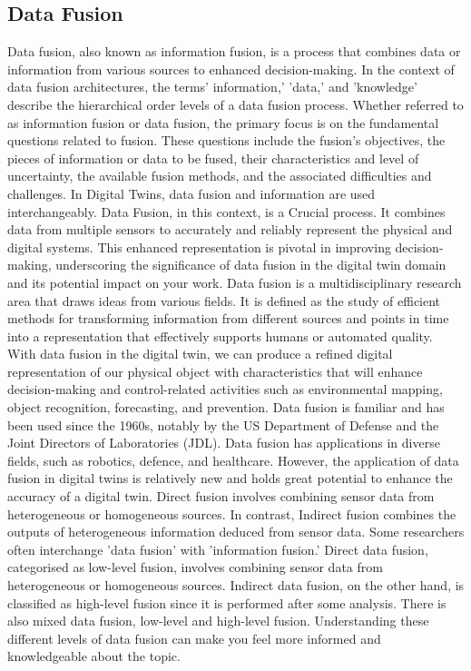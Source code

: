 \subsection{Data Fusion}
Data fusion, also known as information fusion, is a process that combines data or information from various sources to enhanced decision-making. In the context of data fusion architectures, the terms' information,' 'data,' and 'knowledge' describe the hierarchical order levels of a data fusion process. Whether referred to as information fusion or data fusion, the primary focus is on the fundamental questions related to fusion. These questions include the fusion's objectives, the pieces of information or data to be fused, their characteristics and level of uncertainty, the available fusion methods, and the associated difficulties and challenges.  
In Digital Twins, data fusion and information are used interchangeably. Data Fusion, in this context, is a Crucial process. It combines data from multiple sensors to accurately and reliably represent the physical and digital systems. This enhanced representation is pivotal in improving decision-making, underscoring the significance of data fusion in the digital twin domain and its potential impact on your work.  
Data fusion is a multidisciplinary research area that draws ideas from various fields. It is defined as the study of efficient methods for transforming information from different sources and points in time into a representation that effectively supports humans or automated quality. With data fusion in the digital twin, we can produce a refined digital representation of our physical object with characteristics that will enhance decision-making and control-related activities such as environmental mapping, object recognition, forecasting, and prevention. Data fusion is familiar and has been used since the 1960s, notably by the US Department of Defense and the Joint Directors of Laboratories (JDL). Data fusion has applications in diverse fields, such as robotics, defence, and healthcare. However, the application of data fusion in digital twins is relatively new and holds great potential to enhance the accuracy of a digital twin.  
Direct fusion involves combining sensor data from heterogeneous or homogeneous sources. In contrast, Indirect fusion combines the outputs of heterogeneous information deduced from sensor data. Some researchers often interchange 'data fusion' with 'information fusion.' 
Direct data fusion, categorised as low-level fusion, involves combining sensor data from heterogeneous or homogeneous sources. Indirect data fusion, on the other hand, is classified as high-level fusion since it is performed after some analysis. There is also mixed data fusion, low-level and high-level fusion. Understanding these different levels of data fusion can make you feel more informed and knowledgeable about the topic.
